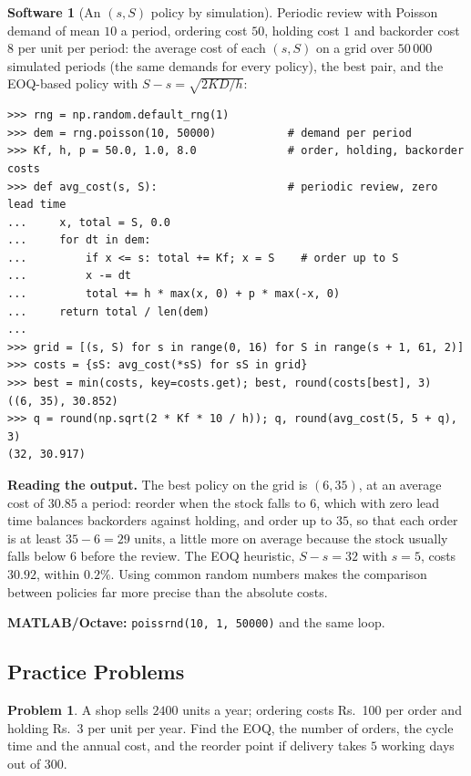 \documentclass[11pt,a4paper]{article}
\numberwithin{equation}{section}
\theoremstyle{definition}
\newtheorem{software}[thm]{Software}
\newtheorem{problemx}{Problem}[subsection]
\newenvironment{problem}{\begin{problemx}}{\end{problemx}}
\begin{document}
\begin{software}[An $(s, S)$ policy by simulation]
\label{sw:sS}
Periodic review with Poisson demand of mean $10$ a period, ordering cost $50$, holding cost $1$ and backorder cost $8$ per unit per period: the average cost of each $(s, S)$ on a grid over $50\,000$ simulated periods (the same demands for every policy), the best pair, and the EOQ-based policy with $S - s = \sqrt{2KD/h}$:
{\small\begin{verbatim}
>>> rng = np.random.default_rng(1)
>>> dem = rng.poisson(10, 50000)           # demand per period
>>> Kf, h, p = 50.0, 1.0, 8.0              # order, holding, backorder costs
>>> def avg_cost(s, S):                    # periodic review, zero lead time
...     x, total = S, 0.0
...     for dt in dem:
...         if x <= s: total += Kf; x = S    # order up to S
...         x -= dt
...         total += h * max(x, 0) + p * max(-x, 0)
...     return total / len(dem)
...
>>> grid = [(s, S) for s in range(0, 16) for S in range(s + 1, 61, 2)]
>>> costs = {sS: avg_cost(*sS) for sS in grid}
>>> best = min(costs, key=costs.get); best, round(costs[best], 3)
((6, 35), 30.852)
>>> q = round(np.sqrt(2 * Kf * 10 / h)); q, round(avg_cost(5, 5 + q), 3)
(32, 30.917)
\end{verbatim}}
\textbf{Reading the output.} The best policy on the grid is $(6, 35)$, at an average cost of $30.85$ a period: reorder when the stock falls to $6$, which with zero lead time balances backorders against holding, and order up to $35$, so that each order is at least $35 - 6 = 29$ units, a little more on average because the stock usually falls below $6$ before the review. The EOQ heuristic, $S - s = 32$ with $s = 5$, costs $30.92$, within
$0.2\%$. Using common random numbers makes the comparison between policies far more precise than the absolute costs.

\textbf{MATLAB/Octave:} \texttt{poissrnd(10, 1, 50000)} and the same loop.
\end{software}

\subsection{Practice Problems}

\begin{problem}
A shop sells $2400$ units a year; ordering costs Rs.~100 per order and holding Rs.~3 per unit per year. Find the EOQ, the number of orders, the cycle time and the annual cost, and the reorder point if delivery takes $5$ working days out of $300$.
\end{problem}
\end{document}

